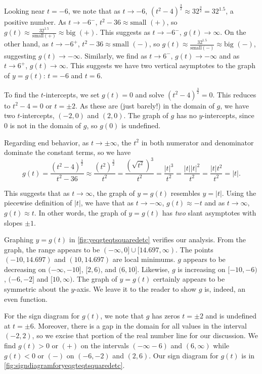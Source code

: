 \begin{ex}
\begin{enumerate}
Looking near $t = -6$, we note that as $t \rightarrow -6$, $(t^2-4)^{\frac{3}{2}} \approx 32^{\frac{3}{2}} = 32^{1.5}$, a positive number.  As $t \rightarrow -6^{-}$, $t^2-36 \approx \text{small $(+)$}$, so $g(t) \approx \frac{32^{1.5}}{\text{small$(+)$}} \approx \text{big $(+)$}$.  This suggests as $t \rightarrow -6^{-}$, $g(t) \rightarrow \infty$.  On the other hand, as $t \rightarrow -6^{+}$, $t^2 -36 \approx \text{small $(-)$}$, so $g(t) \approx \frac{32^{1.5}}{\text{small$(-)$}} \approx \text{big $(-)$}$, suggesting $g(t) \rightarrow -\infty$. Similarly, we find as $t \rightarrow 6^{-}$, $g(t) \rightarrow -\infty$ and as $t \rightarrow 6^{+}$, $g(t) \rightarrow \infty$.  This suggests we have two vertical asymptotes to the graph of $y = g(t)$:  $t = -6$ and $t = 6$.

To find the $t$-intercepts, we set $g(t) = 0$ and solve $(t^2-4)^{\frac{3}{2}} = 0$. This reduces to $t^2-4 =0$ or $t = \pm 2$.  As these are (just barely!) in the domain of $g$, we have two $t$-intercepts, $(-2,0)$ and $(2,0)$.  The graph of $g$ has no $y$-intercepts, since $0$ is not in the domain of $g$, so $g(0)$ is undefined.

Regarding end behavior, as $t \rightarrow \pm \infty$, the $t^2$ in both numerator and denominator dominate the constant terms, so we have \[ g(t) =  \dfrac{ (t^2-4)^{\frac{3}{2}} }{t^2-36} \approx  \dfrac{\left(t^2\right)^{\frac{3}{2}}}{t^2} = \dfrac{\left(\sqrt{t^2} \right)^3}{t^2} = \dfrac{|t|^3}{t^2} = \dfrac{|t| |t|^2}{t^2} = \dfrac{|t| t^2}{t^2} = |t|. \]


This suggests that as $t \rightarrow \infty$, the graph of $y = g(t)$ resembles $y = |t|$.  Using the piecewise definition of $|t|$, we have that as $t \rightarrow -\infty$, $g(t) \approx -t$ and as $t \rightarrow \infty$, $g(t) \approx t$.  In other words, the graph of  $y = g(t)$ has \textit{two} slant asymptotes with slopes $\pm 1$. 

Graphing $y=g(t)$ in \autoref{fig:yeqgteqtsquaredetc} verifies our analysis.  From the graph, the range appears to be $(-\infty, 0] \cup [14.697, \infty)$.  The points $(-10, 14.697)$ and $(10, 14.697)$ are local minimums.  $g$ appears to be decreasing on  $(-\infty, -10]$, $[2, 6)$, and $(6, 10]$. Likewise, $g$ is increasing on $[-10, -6)$, $(-6, -2]$ and $[10, \infty)$.  The graph of $y=g(t)$ certainly appears to be symmetric about the $y$-axis.  We leave it to the reader to show $g$ is, indeed, an even function.

For the sign diagram for $g(t)$, we note that $g$ has zeros $t = \pm 2$ and is undefined at $t = \pm 6$.  Moreover, there is a gap in the domain for all values in the interval $(-2,2)$, so we excise that portion of the real number line for our discussion.  We find $g(t) > 0$ or $(+)$ on the intervals $(-\infty -6)$ and $(6, \infty)$ while $g(t) < 0$ or $(-)$ on $(-6,-2)$ and $(2, 6)$.  Our sign diagram for $g(t)$ is in \autoref{fig:signdiagramforyeqgteqtsquaredetc}.  


\end{enumerate}
\end{ex}
